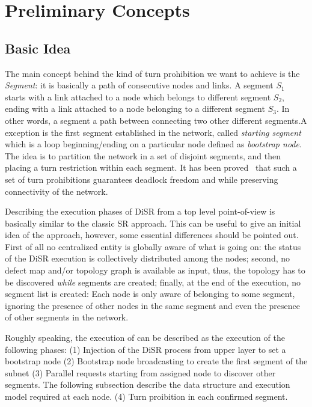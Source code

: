 
\section{Preliminary Concepts}
\label{sec:disr_concepts}

\subsection{Basic Idea}
The main concept behind the kind of turn prohibition we want to
achieve is the \emph{Segment}: it is basically a path of consecutive
nodes and links. A segment $S_1$ starts with a link attached to a node which
belongs to different segment $S_2$, ending with a link attached to a
node belonging to a different segment $S_3$. In other words, a segment
a path between connecting two other different segments.A exception is
the first segment established in the network, called \emph{starting
segment} which is  a loop beginning/ending on a particular node
defined as \emph{bootstrap node}.
The idea is to partition the network in a set of disjoint segments, and then
placing a turn restriction within each segment. It has been proved~\cite{mejia_ipdps06}
that such a set of turn prohibitions guarantees deadlock freedom and
while preserving connectivity of the network.

Describing the execution phases of DiSR from a top level point-of-view
is basically similar to the classic SR approach. This can be useful to
give an initial idea of the approach, however, some essential
differences should be pointed out. First of all no centralized entity is
globally aware of what is going on: the status of the DiSR execution
is collectively distributed among the nodes; second, no defect map and/or
topology graph is available as input, thus, the topology has to be
discovered \emph{while} segments are created; finally, at the end of the
execution, no segment list is created: Each node is only aware of
belonging to some segment, ignoring the presence of other nodes
in the same segment and even the presence of other segments in the
network.

Roughly speaking, the execution of can be described as the execution
of the following phases: (1) Injection of the DiSR process from upper layer to set a bootstrap
node (2) Bootstrap node broadcasting to create the first segment of the subnet
(3) Parallel requests starting from assigned node to discover other
segments. The following subsection describe the data structure and
execution model required at each node. (4) Turn proibition in each
confirmed segment.

